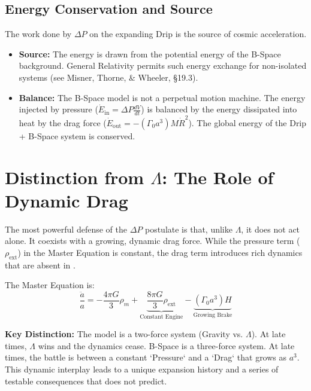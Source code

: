 \documentclass{BSpacePaper} %
\begin{document}
\subsection{Energy Conservation and Source}
The work done by $\Delta P$ on the expanding Drip is the source of cosmic acceleration.
\begin{itemize}
    \item \textbf{Source:} The energy is drawn from the potential energy of the B-Space background. General Relativity permits such energy exchange for non-isolated systems (see Misner, Thorne, \& Wheeler, §19.3).
    \item \textbf{Balance:} The B-Space model is not a perpetual motion machine. The energy injected by pressure ($\dot{E}_{\text{in}} = \Delta P \frac{dV}{dt}$) is balanced by the energy dissipated into heat by the drag force ($\dot{E}_{\text{out}} = -(\Gamma_0 a^3)M\dot{R}^2$). The global energy of the Drip + B-Space system is conserved.
\end{itemize}

\section{Distinction from \(\Lambda\): The Role of Dynamic Drag}
The most powerful defense of the $\Delta P$ postulate is that, unlike \(\Lambda\), it does not act alone. It coexists with a growing, dynamic drag force. While the pressure term ($\rho_{\text{ext}}$) in the Master Equation is constant, the drag term introduces rich dynamics that are absent in \lcdm{}.

The Master Equation is:
\begin{equation}
    \frac{\ddot{a}}{a} = -\frac{4\pi G}{3}\rho_m + \underbrace{\frac{8\pi G}{3}\rho_{\text{ext}}}_{\text{Constant Engine}} - \underbrace{(\Gamma_{0} a^3) H}_{\text{Growing Brake}}
\end{equation}

\textbf{Key Distinction:} The \lcdm{} model is a two-force system (Gravity vs. \(\Lambda\)). At late times, \(\Lambda\) wins and the dynamics cease. B-Space is a three-force system. At late times, the battle is between a constant `Pressure` and a `Drag` that grows as $a^3$. This dynamic interplay leads to a unique expansion history and a series of testable consequences that \lcdm{} does not predict.
\end{document}
